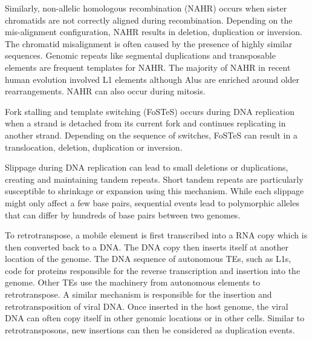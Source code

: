 Similarly, non-allelic homologous recombination (NAHR) occurs when sister chromatids are not correctly aligned during recombination.
Depending on the mis-alignment configuration, NAHR results in deletion, duplication or inversion.
The chromatid misalignment is often caused by the presence of highly similar sequences.
Genomic repeats like segmental duplications and transposable elements are frequent templates for NAHR.
The majority of NAHR in recent human evolution involved L1 elements although Alus are enriched around older rearrangements\cite{Bourque2009,Kim2008}.
NAHR can also occur during mitosis\cite{Gu2008}.


Fork stalling and template switching (FoSTeS) occurs during DNA replication when a strand is detached from its current fork and continues replicating in another strand.
Depending on the sequence of switches, FoSTeS can result in a translocation, deletion, duplication or inversion.

Slippage during DNA replication can lead to small deletions or duplications, creating and maintaining tandem repeats.
Short tandem repeats are particularly susceptible to shrinkage or expansion using this mechanism.
While each slippage might only affect a few base pairs, sequential events lead to polymorphic alleles that can differ by hundreds of base pairs between two genomes.
\begin{comment}
  Slippage occurs when the DNA polymerase and the newly synthesized stand detaches when it encounters a DNA repeat and reattach after pairing with a non-allelic repeat, usually upstream (resulting in expansion).
  The shrinkage/expansion is caused by the template/daughter strand contracting when forming a hairpin due to the repeats.
  This type of repeat-induced secondary structure can also contribute to the replication stalling and detachment.
\end{comment}

To retrotranspose, a mobile element is first transcribed into a RNA copy which is then converted back to a DNA.
The DNA copy then inserts itself at another location of the genome.
The DNA sequence of autonomous TEs, such as L1s, code for proteins responsible for the reverse transcription and insertion into the genome.
Other TEs use the machinery from autonomous elements to retrotranspose. 
A similar mechanism is responsible for the insertion and retrotransposition of viral DNA.
Once inserted in the host genome, the viral DNA can often copy itself in other genomic locations or in other cells.
Similar to retrotransposons, new insertions can then be considered as duplication events.

